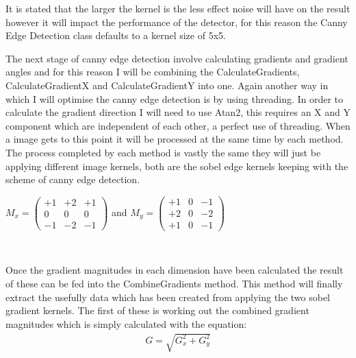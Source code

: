 \begin{FlushLeft}
    It is stated that the larger the kernel is the less effect noise will have on the result however it will impact the performance of the detector, for this reason the Canny Edge Detection class defaults to a kernel size of 5x5. \\ \bk

    The next stage of canny edge detection involve calculating gradients and gradient angles and for this reason I will be combining the CalculateGradients, CalculateGradientX and CalculateGradientY into one. Again another way in which I will optimise the canny edge detection is by using threading. In order to calculate the gradient direction I will need to use Atan2, this requires an X and Y component which are independent of each other, a perfect use of threading. When a image gets to this point it will be processed at the same time by each method. The process completed by each method is vastly the same they will just be applying different image kernels, both are the sobel edge kernels keeping with the scheme of canny edge detection. \\ \bk   

    \begin{center}
        
        $
        M_x = \begin{pmatrix}
            +1 & +2 & +1 \\
            0 & 0 & 0 \\
            -1 & -2 & -1
        \end{pmatrix}
    $ 
    and $ M_y = \begin{pmatrix}
            +1 & 0 & -1 \\
            +2 & 0 & -2 \\
            +1 & 0 & -1 
        \end{pmatrix}
    $
    \end{center} \\
 
    \bk

    Once the gradient magnitudes in each dimension have been calculated the result of these can be fed into the CombineGradients method. This method will finally extract the usefully data which has been created from applying the two sobel gradient kernels. The first of these is working out the combined gradient magnitudes which is simply calculated with the equation: \\
    
    \begin{gather*}
        G = \sqrt{G_x^2 + G_y^2}
    \end{gather*} \\
    

\end{FlushLeft}

